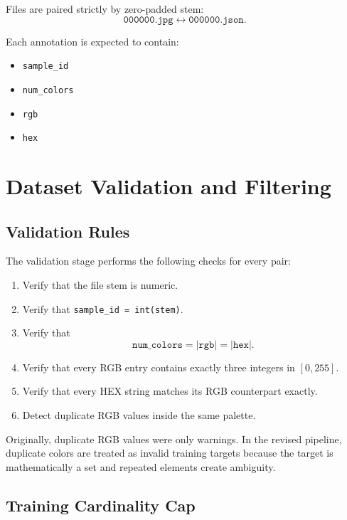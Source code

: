 \documentclass[11pt,a4paper]{article}
\begin{document}
Files are paired strictly by zero-padded stem:
\begin{equation}
\texttt{000000.jpg} \leftrightarrow \texttt{000000.json}.
\end{equation}

Each annotation is expected to contain:
\begin{itemize}[leftmargin=2em]
    \item \texttt{sample\_id}
    \item \texttt{num\_colors}
    \item \texttt{rgb}
    \item \texttt{hex}
\end{itemize}

\section{Dataset Validation and Filtering}

\subsection{Validation Rules}

The validation stage performs the following checks for every pair:
\begin{enumerate}[leftmargin=2em]
    \item Verify that the file stem is numeric.
    \item Verify that \texttt{sample\_id = int(stem)}.
    \item Verify that
    \begin{equation}
    \texttt{num\_colors} = |\texttt{rgb}| = |\texttt{hex}|.
    \end{equation}
    \item Verify that every RGB entry contains exactly three integers in $[0,255]$.
    \item Verify that every HEX string matches its RGB counterpart exactly.
    \item Detect duplicate RGB values inside the same palette.
\end{enumerate}

Originally, duplicate RGB values were only warnings. In the revised pipeline, duplicate colors are treated as invalid training targets because the target is mathematically a set and repeated elements create ambiguity.

\subsection{Training Cardinality Cap}
\end{document}
